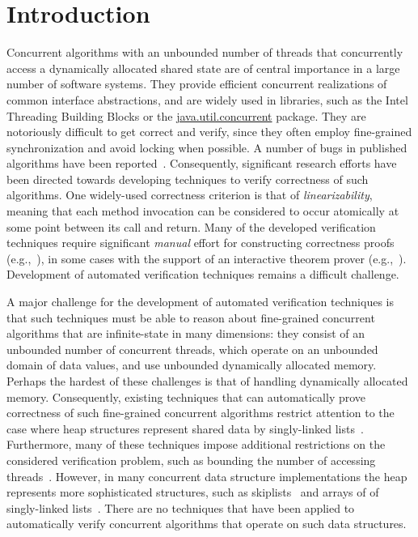 \section{Introduction}



Concurrent algorithms with an unbounded number of
threads that concurrently access a dynamically allocated shared state
are of central importance in a large number of software systems.
They provide efficient concurrent realizations of
common interface abstractions, and
are widely used in libraries,
such as the Intel Threading Building Blocks or
the \url{java.util.concurrent} package.
They are notoriously difficult to get correct and verify, since they
often employ fine-grained synchronization and avoid locking when
possible. A number of bugs  in published
algorithms have been reported~\cite{DDGJLMMSS:dcas,MiSc:correction}.
Consequently, significant research efforts have been directed towards developing
techniques to verify correctness of such algorithms.
One widely-used correctness criterion is that of {\em linearizability},
meaning that each method invocation can be considered to occur atomically at some point
between its call and return.
Many of the developed verification techniques require significant
{\em manual} effort for constructing correctness proofs
(e.g.,~\cite{LF:pldi13,Vafeiadis:Thesis}),
in some cases with the support of an interactive theorem prover
(e.g.,~\cite{Aaron:logical:linearizability,Colvin:Lazy-List,SDW:tcl14}).
Development of automated verification techniques remains a difficult challenge.

A major challenge for the development of automated verification techniques
is that such techniques must be
able to reason about fine-grained concurrent algorithms that are infinite-state
in many dimensions:
they consist of an unbounded number of concurrent threads, which
operate on an unbounded domain of data values, and use
unbounded dynamically allocated memory. 
Perhaps the hardest of these challenges is that of handling 
dynamically allocated memory.
Consequently, existing techniques that can automatically prove correctness
of such fine-grained concurrent algorithms restrict attention to the
case where heap structures represent shared data by singly-linked 
lists~\cite{AHHR:integrated:short,meyer:vmcai16,Quy:sas16,Sagiv:correlation,Vafeiadis:cav10}. Furthermore, many of these techniques impose additional restrictions on the considered verification problem, such as bounding the number of accessing
threads~\cite{Amit:comparisonAbstraction,Vechev:spin09,CernyRZCA:CAV10}.
However, in many concurrent data structure implementations the heap represents
more sophisticated structures, such as 
skiplists~\cite{Fomitchev:2004,ArtOfMpP,Sundell:2005} and arrays of
of singly-linked lists~\cite{ts-stack}. There are no
techniques that have been applied to automatically verify concurrent algorithms
that operate on such data structures.

